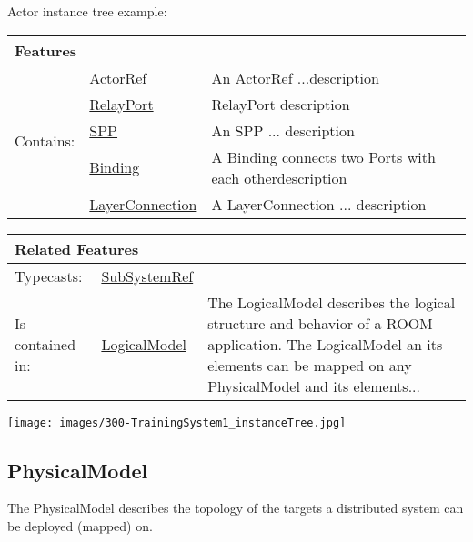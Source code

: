 				Actor instance tree example:
			
			
			\vspace{\baselineskip}
			\begingroup
			\renewcommand{\arraystretch}{1.8} %
			\parbox{\textwidth}{
			\begin{longtable}{l l p{}}
				\multicolumn{2}{l}{\textbf{\large Features}} & \\
				\hline
			\multirow{5}{*}{Contains:} & \tabitem \hyperlink{ref:ActorRef}{ActorRef}  & An ActorRef ...description\\
			& \tabitem \hyperlink{ref:RelayPort}{RelayPort}  & RelayPort description \\
			& \tabitem \hyperlink{ref:SPP}{SPP}  & An SPP ... description \\
			& \tabitem \hyperlink{ref:Binding}{Binding}  & A Binding connects two Ports with each otherdescription \\
			& \tabitem \hyperlink{ref:LayerConnection}{LayerConnection}  & A LayerConnection ... description  \\
			\hline
			\end{longtable}	
			}
			\endgroup
			\vspace{\baselineskip}
			
			\vspace{\baselineskip}
			\begingroup
			\renewcommand{\arraystretch}{1.8} %
			\parbox{\textwidth}{
			\begin{longtable}{l l p{}}
				\multicolumn{2}{l}{\textbf{\large Related Features}} & \\
				\hline
			Typecasts: & \tabitem \hyperlink{ref:SubSystemRef}{SubSystemRef}  & \\
			\hline
			Is contained in: & \tabitem \hyperlink{ref:LogicalModel}{LogicalModel}  & The LogicalModel describes the logical structure and behavior of a ROOM application. The LogicalModel an its elements can be mapped on any PhysicalModel and its elements...\\
			\hline
			\end{longtable}	
			}
			\endgroup
			\vspace{\baselineskip}
			
			\texttt{[image: images/300-TrainingSystem1\_instanceTree.jpg]}
			
		\subsection{PhysicalModel}
		The PhysicalModel describes the topology of the targets a distributed system can be deployed (mapped) on.
	
